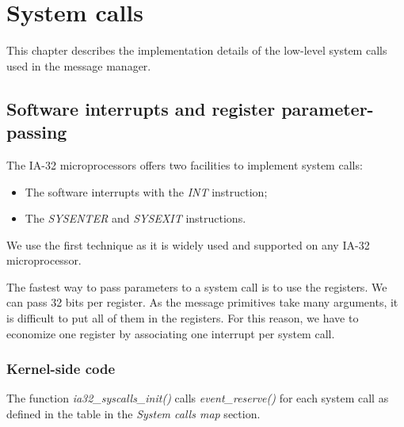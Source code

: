 %
%
%
%
%
%

%
%

\chapter{System calls}

This chapter describes the implementation details of the low-level
system calls used in the message manager.

\newpage

%
%

\section{Software interrupts and register parameter-passing}

The IA-32 microprocessors offers two facilities to implement system
calls:

\begin{itemize}
  \item
    The software interrupts with the \textit{INT} instruction;
  \item
    The \textit{SYSENTER} and \textit{SYSEXIT} instructions.
\end{itemize}

We use the first technique as it is widely used and supported on any
IA-32 microprocessor.

The fastest way to pass parameters to a system call is to use the
registers. We can pass 32 bits per register. As the message primitives
take many arguments, it is difficult to put all of them in the
registers. For this reason, we have to economize one register by
associating one interrupt per system call.

%
%

\subsection{Kernel-side code}

The function \textit{ia32\_syscalls\_init()} calls
\textit{event\_reserve()} for each system call as defined in the table
in the \textit{System calls map} section.

